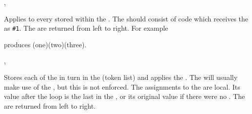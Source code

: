 \documentclass[oneside]{book}
\begin{document}

\begin{function}{\ClistMapInline,\ClistVarMapInline}
\begin{syntax}
  
  
\end{syntax}
Applies  to every  stored
within the . The  should
consist of code which receives the  as \verb|#1|.
The  are returned from left to right.
For example
\begin{codehigh}
\IgnoreSpacesOn
\TlClear \lTmpaTl
{} {
  \TlPutRight {}
}
\Result {\TlUse\lTmpaTl}
\IgnoreSpacesOff
\end{codehigh}
produces (one)(two)(three).
\end{function}

\begin{function}{\ClistMapVariable,\ClistVarMapVariable}
\begin{syntax}
   
   
\end{syntax}
Stores each  of the  in turn in the
(token list)  and applies the .  The
 will usually make use of the , but this
is not enforced.  The assignments to the  are local.
Its value after the loop is the last  in the , or its original value if there were no .  The
 are returned from left to right.
\end{function}
 
 
\end{document}
